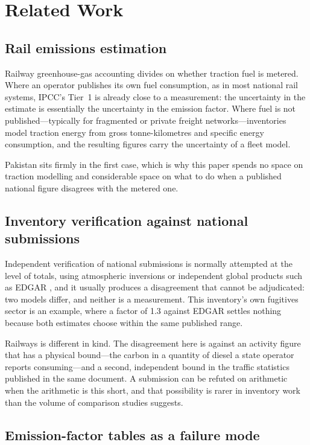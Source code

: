 \section{Related Work}
\label{sec:related}

\subsection{Rail emissions estimation}

Railway greenhouse-gas accounting divides on whether traction fuel is metered. Where an
operator publishes its own fuel consumption, as in most national rail systems, IPCC's Tier~1 is
already close to a measurement: the uncertainty in the estimate is essentially the uncertainty
in the emission factor. Where fuel is not published---typically for fragmented or private
freight networks---inventories model traction energy from gross tonne-kilometres and specific
energy consumption, and the resulting figures carry the uncertainty of a fleet model.

Pakistan sits firmly in the first case, which is why this paper spends no space on traction
modelling and considerable space on what to do when a published national figure disagrees with
the metered one.

\subsection{Inventory verification against national submissions}

Independent verification of national submissions is normally attempted at the level of totals,
using atmospheric inversions or independent global products such as EDGAR
\citep{edgar2025booklet}, and it usually produces a disagreement that cannot be adjudicated: two
models differ, and neither is a measurement. This inventory's own fugitives sector is an
example, where a factor of \num{1.3} against EDGAR settles nothing because both estimates
choose within the same published range.

Railways is different in kind. The disagreement here is against an activity figure that has a
physical bound---the carbon in a quantity of diesel a state operator reports consuming---and a
second, independent bound in the traffic statistics published in the same document. A
submission can be refuted on arithmetic when the arithmetic is this short, and that possibility
is rarer in inventory work than the volume of comparison studies suggests.

\subsection{Emission-factor tables as a failure mode}

